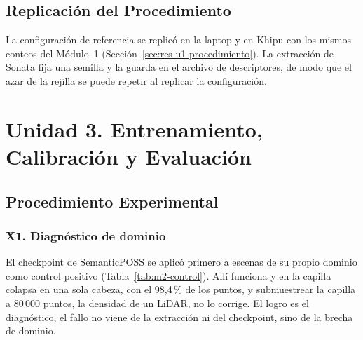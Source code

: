 \FloatBarrier
\subsection[Replicación del Procedimiento]{Replicación del Procedimiento}

La configuración de referencia se replicó en la laptop y en Khipu con los mismos conteos
del Módulo~1 (Sección~\ref{sec:res-u1-procedimiento}). La extracción de Sonata fija una
semilla y la guarda en el archivo de descriptores, de modo que el azar de la rejilla se
puede repetir al replicar la configuración.

\FloatBarrier
\section[Unidad 3. Entrenamiento, Calibración y Evaluación]{Unidad 3. Entrenamiento, Calibración y Evaluación}
\label{sec:res-unidad3}

\FloatBarrier
\subsection[Procedimiento Experimental]{Procedimiento Experimental}
\label{sec:res-u3-proc}

\subsubsection*{X1. Diagnóstico de dominio}

El checkpoint de SemanticPOSS se aplicó primero a escenas de su propio dominio
como control positivo (Tabla~\ref{tab:m2-control}). Allí funciona y en la capilla
colapsa en una sola cabeza, con el 98{,}4\,\% de los puntos, y submuestrear la
capilla a 80\,000 puntos, la densidad de un LiDAR, no lo corrige. El logro es el
diagnóstico, el fallo no viene de la extracción ni del checkpoint, sino de la brecha
de dominio.


